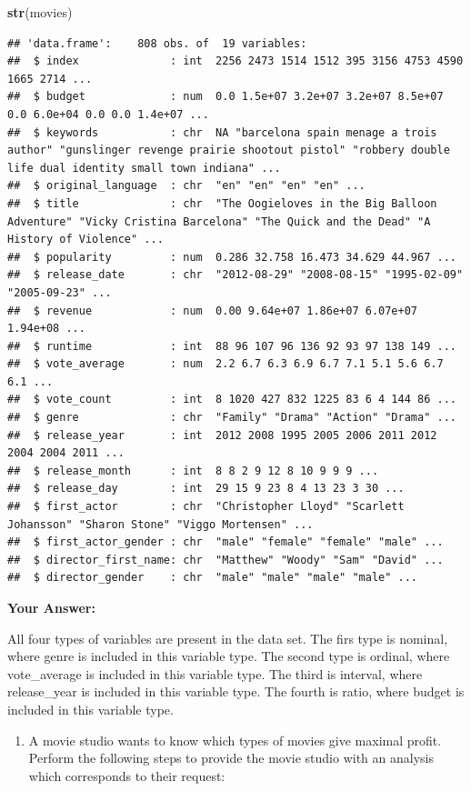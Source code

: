 \documentclass[
]{article}
\newenvironment{Shaded}{\begin{snugshade}}{\end{snugshade}}
\newcommand{\FunctionTok}[1]{\textcolor[rgb]{0.13,0.29,0.53}{\textbf{#1}}}
\newcommand{\NormalTok}[1]{#1}
\providecommand{\tightlist}{%
  \setlength{\itemsep}{0pt}\setlength{\parskip}{0pt}}
\begin{document}
\begin{Shaded}
\begin{Highlighting}[]
\FunctionTok{str}\NormalTok{(movies)}
\end{Highlighting}
\end{Shaded}

\begin{verbatim}
## 'data.frame':    808 obs. of  19 variables:
##  $ index              : int  2256 2473 1514 1512 395 3156 4753 4590 1665 2714 ...
##  $ budget             : num  0.0 1.5e+07 3.2e+07 3.2e+07 8.5e+07 0.0 6.0e+04 0.0 0.0 1.4e+07 ...
##  $ keywords           : chr  NA "barcelona spain menage a trois author" "gunslinger revenge prairie shootout pistol" "robbery double life dual identity small town indiana" ...
##  $ original_language  : chr  "en" "en" "en" "en" ...
##  $ title              : chr  "The Oogieloves in the Big Balloon Adventure" "Vicky Cristina Barcelona" "The Quick and the Dead" "A History of Violence" ...
##  $ popularity         : num  0.286 32.758 16.473 34.629 44.967 ...
##  $ release_date       : chr  "2012-08-29" "2008-08-15" "1995-02-09" "2005-09-23" ...
##  $ revenue            : num  0.00 9.64e+07 1.86e+07 6.07e+07 1.94e+08 ...
##  $ runtime            : int  88 96 107 96 136 92 93 97 138 149 ...
##  $ vote_average       : num  2.2 6.7 6.3 6.9 6.7 7.1 5.1 5.6 6.7 6.1 ...
##  $ vote_count         : int  8 1020 427 832 1225 83 6 4 144 86 ...
##  $ genre              : chr  "Family" "Drama" "Action" "Drama" ...
##  $ release_year       : int  2012 2008 1995 2005 2006 2011 2012 2004 2004 2011 ...
##  $ release_month      : int  8 8 2 9 12 8 10 9 9 9 ...
##  $ release_day        : int  29 15 9 23 8 4 13 23 3 30 ...
##  $ first_actor        : chr  "Christopher Lloyd" "Scarlett Johansson" "Sharon Stone" "Viggo Mortensen" ...
##  $ first_actor_gender : chr  "male" "female" "female" "male" ...
##  $ director_first_name: chr  "Matthew" "Woody" "Sam" "David" ...
##  $ director_gender    : chr  "male" "male" "male" "male" ...
\end{verbatim}

\textbf{Your Answer:}

All four types of variables are present in the data set. The firs type
is nominal, where genre is included in this variable type. The second
type is ordinal, where vote\_average is included in this variable type.
The third is interval, where release\_year is included in this variable
type. The fourth is ratio, where budget is included in this variable
type.

\begin{enumerate}
\def\labelenumi{\arabic{enumi}.}
\setcounter{enumi}{2}
\tightlist
\item
  A movie studio wants to know which types of movies give maximal
  profit. Perform the following steps to provide the movie studio with
  an analysis which corresponds to their request:
\end{enumerate}
\end{document}

